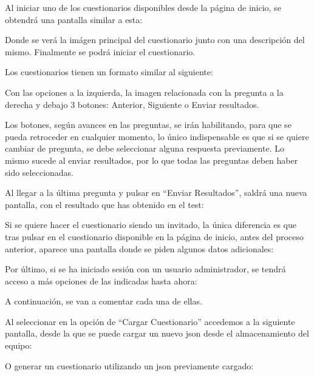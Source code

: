 Al iniciar uno de los cuestionarios disponibles desde la página de inicio, se obtendrá una pantalla similar a esta:


Donde se verá la imágen principal del cuestionario junto con una descripción del mismo. Finalmente se podrá iniciar el cuestionario.

Los cuestionarios tienen un formato similar al siguiente:


Con las opciones a la izquierda, la imagen relacionada con la pregunta a la derecha y debajo 3 botones: Anterior, Siguiente o Enviar resultados.

Los botones, según avances en las preguntas, se irán habilitando, para que se pueda retroceder en cualquier momento, lo único indispensable es que si se quiere cambiar de pregunta, se debe seleccionar alguna respuesta previamente. Lo mismo sucede al enviar resultados, por lo que todas las preguntas deben haber sido seleccionadas.

Al llegar a la última pregunta y pulsar en ``Enviar Resultados'', saldrá una nueva pantalla, con el resultado que has obtenido en el test:


Si se quiere hacer el cuestionario siendo un invitado, la única diferencia es que tras pulsar en el cuestionario disponible en la página de inicio, antes del proceso anterior, aparece una pantalla donde se piden algunos datos adicionales:


Por último, si se ha iniciado sesión con un usuario administrador, se tendrá acceso a más opciones de las indicadas hasta ahora:


A continuación, se van a comentar cada una de ellas.

Al seleccionar en la opción de ``Cargar Cuestionario'' accedemos a la siguiente pantalla, desde la que se puede cargar un nuevo json desde el almacenamiento del equipo:


O generar un cuestionario utilizando un json previamente cargado:

